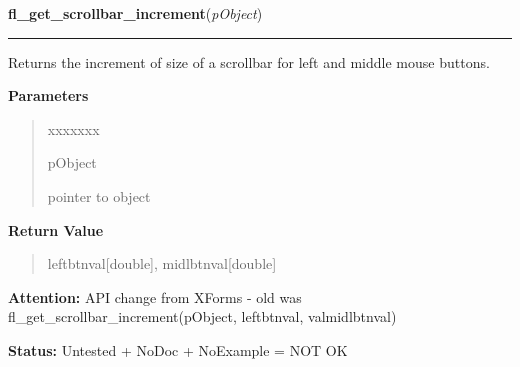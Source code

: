 \hspace{.8\funcindent}\begin{boxedminipage}{\funcwidth}

    \raggedright \textbf{fl\_get\_scrollbar\_increment}(\textit{pObject})

    \vspace{-1.5ex}

    \rule{\textwidth}{0.5\fboxrule}
\setlength{\parskip}{2ex}
    Returns the increment of size of a scrollbar for left and middle mouse 
    buttons.

\setlength{\parskip}{1ex}
      \textbf{Parameters}
      \vspace{-1ex}

      \begin{quote}
        \begin{Ventry}{xxxxxxx}

          \item[pObject]

          pointer to object

        \end{Ventry}

      \end{quote}

      \textbf{Return Value}
    \vspace{-1ex}

      \begin{quote}
      leftbtnval[double], midlbtnval[double]

      \end{quote}

\textbf{Attention:} API change from XForms - old was fl\_get\_scrollbar\_increment(pObject, 
leftbtnval, valmidlbtnval)



\textbf{Status:} Untested + NoDoc + NoExample = NOT OK



    \end{boxedminipage}

    \label{xformslib:library:fl_set_scrollbar_bounds}

    \vspace{0.5ex}

